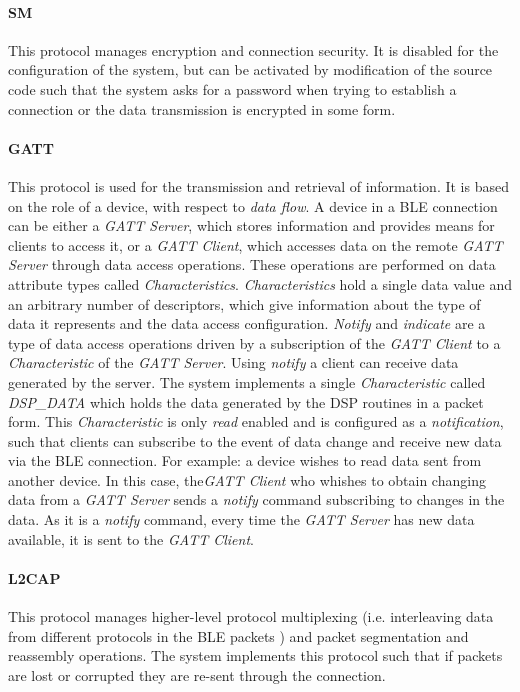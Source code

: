 \paragraph{SM}
This protocol manages encryption and connection security. It is disabled for the configuration of the system, but can be activated by modification of the source code such that the system asks for a password when trying to establish a connection or the data transmission is encrypted in some form.

\paragraph{GATT}
This protocol is used for the transmission and retrieval of information. It is based on the role of a device, with respect to \textit{data flow}. A device in a BLE connection can be either a \textit{GATT Server}, which stores information and provides means for clients to access it, or a \textit{GATT Client}, which accesses data on the remote \textit{GATT Server} through data access operations. These operations are performed on data attribute types called \textit{Characteristics}. \textit{Characteristics} hold a single data value and an arbitrary number of descriptors, which give information about the type of data it represents and the data access configuration. \textit{Notify} and \textit{indicate} are a type of data access operations driven by a subscription of the \textit{GATT Client} to a \textit{Characteristic} of the \textit{GATT Server}. Using \textit{notify} a client can receive data generated by the server. The system implements a single \textit{Characteristic} called \textit{DSP\_DATA} which holds the data generated by the DSP routines in a packet form. This \textit{Characteristic} is only \textit{read} enabled and is configured as a \textit{notification}, such that clients can subscribe to the event of data change and receive new data via the BLE connection. For example: a device wishes to read data sent from another device. In this case, the\textit{GATT Client} who whishes to obtain changing data from a \textit{GATT Server} sends a \textit{notify} command subscribing to changes in the data. As it is a \textit{notify} command, every time the \textit{GATT Server} has new data available, it is sent to the \textit{GATT Client}.

\paragraph{L2CAP}
This protocol manages higher-level protocol multiplexing (i.e. interleaving data from different protocols in the BLE packets \cite{Blel2cap}) and packet segmentation and reassembly operations. The system implements this protocol such that if packets are lost or corrupted they are re-sent through the connection.

